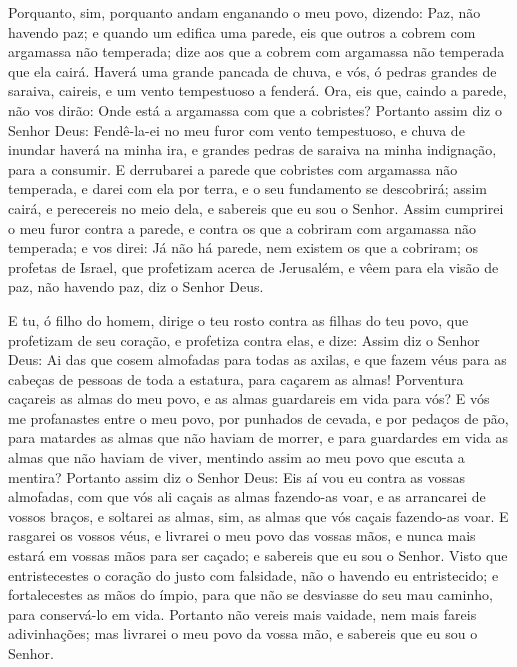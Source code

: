 Porquanto, sim, porquanto andam enganando o meu povo, dizendo:
Paz, não havendo paz; e quando um edifica uma parede, eis que outros
a cobrem com argamassa não temperada; dize aos que a cobrem
com argamassa não temperada que ela cairá. Haverá uma grande pancada
de chuva, e vós, ó pedras grandes de saraiva, caireis, e um vento
tempestuoso a fenderá. Ora, eis que, caindo a parede, não vos
dirão: Onde está a argamassa com que a cobristes? Portanto
assim diz o Senhor Deus: Fendê-la-ei no meu furor com vento
tempestuoso, e chuva de inundar haverá na minha ira, e grandes
pedras de saraiva na minha indignação, para a consumir. E
derrubarei a parede que cobristes com argamassa não temperada, e
darei com ela por terra, e o seu fundamento se descobrirá; assim
cairá, e perecereis no meio dela, e sabereis que eu sou o Senhor.
Assim cumprirei o meu furor contra a parede, e contra os que
a cobriram com argamassa não temperada; e vos direi: Já não há
parede, nem existem os que a cobriram; os profetas de Israel,
que profetizam acerca de Jerusalém, e vêem para ela visão de paz,
não havendo paz, diz o Senhor Deus.

E tu, ó filho do homem, dirige o teu rosto contra as filhas do
teu povo, que profetizam de seu coração, e profetiza contra elas,
e dize: Assim diz o Senhor Deus: Ai das que cosem almofadas
para todas as axilas, e que fazem véus para as cabeças de pessoas de
toda a estatura, para caçarem as almas! Porventura caçareis as almas
do meu povo, e as almas guardareis em vida para vós? E vós me
profanastes entre o meu povo, por punhados de cevada, e por pedaços
de pão, para matardes as almas que não haviam de morrer, e para
guardardes em vida as almas que não haviam de viver, mentindo assim
ao meu povo que escuta a mentira? Portanto assim diz o Senhor
Deus: Eis aí vou eu contra as vossas almofadas, com que vós ali
caçais as almas fazendo-as voar, e as arrancarei de vossos braços, e
soltarei as almas, sim, as almas que vós caçais fazendo-as voar.
E rasgarei os vossos véus, e livrarei o meu povo das vossas
mãos, e nunca mais estará em vossas mãos para ser caçado; e sabereis
que eu sou o Senhor. Visto que entristecestes o coração do
justo com falsidade, não o havendo eu entristecido; e fortalecestes
as mãos do ímpio, para que não se desviasse do seu mau caminho, para
conservá-lo em vida. Portanto não vereis mais vaidade, nem
mais fareis adivinhações; mas livrarei o meu povo da vossa mão, e
sabereis que eu sou o Senhor.

\medskip

